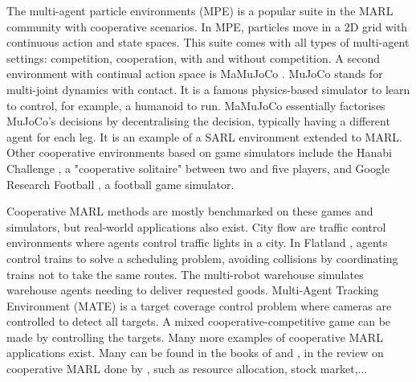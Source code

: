 
The multi-agent particle environments (MPE) \citep{lowe2017multi} is a popular suite in the MARL community with cooperative scenarios.
In MPE, particles move in a 2D grid with continuous action and state spaces.
This suite comes with all types of multi-agent settings: competition, cooperation, with and without competition.
A second environment with continual action space is MaMuJoCo \citep{peng2021facmac}.
MuJoCo \citep{todorov2012mujoco} stands for multi-joint dynamics with contact.
It is a famous physics-based simulator to learn to control, for example, a humanoid to run.
MaMuJoCo essentially factorises MuJoCo's decisions by decentralising the decision, typically having a different agent for each leg.
It is an example of a SARL environment extended to MARL.
Other cooperative environments based on game simulators include the Hanabi Challenge \citep{Bard_2020}, a "cooperative solitaire" between two and five players, and Google Research Football \citep{kurach2020google}, a football game simulator.

Cooperative MARL methods are mostly benchmarked on these games and simulators, but real-world applications also exist.
City flow \citep{zhang2019cityflow} are traffic control environments where agents control traffic lights in a city.
In Flatland \citep{mohanty2020flatland}, agents control trains to solve a scheduling problem, avoiding collisions by coordinating trains not to take the same routes.
The multi-robot warehouse \citep{papoudakis2021benchmarking, christianos2020shared} simulates warehouse agents needing to deliver requested goods.
Multi-Agent Tracking Environment (MATE) \citep{NEURIPS2022_b2a1c152} is a target coverage control problem where cameras are controlled to detect all targets.
A mixed cooperative-competitive game can be made by controlling the targets.
Many more examples of cooperative MARL applications exist.
Many can be found in the books of \cite{DecPomdp} and \cite{marl-book}, in the review on cooperative MARL done by \cite{oroojlooy2022review}, such as resource allocation, stock market,...


